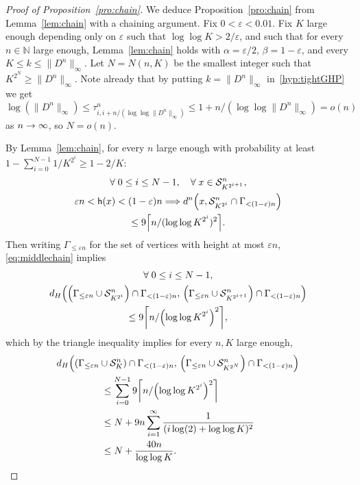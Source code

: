 \documentclass[10pt]{amsart}
\theoremstyle{definition}\newtheorem{defi}[theo]{Definition}\newtheorem{rema}[theo]{Remark}\newtheorem{exam}[theo]{Example}\newtheorem{exem}[theo]{Example}\newtheorem{nota}[theo]{Notation}
\newcommand{\e}{\varepsilon}
\newcommand{\N}{\mathbb{N}}
\newcommand{\1}{\mathbbm{1}}
\newcommand{\trail}{\mathcal{S}}
\newcommand{\h}{\mathsf{h}}
\let\originalleft\left
\let\originalright\right
\renewcommand{\left}{\mathopen{}\mathclose\bgroup\originalleft}
\renewcommand{\right}{\aftergroup\egroup\originalright}
\renewcommand*{\to}{\mathchoice{\longrightarrow}{\rightarrow}{\rightarrow}{\rightarrow}}
\renewcommand*{\implies}{\mathchoice{\Longrightarrow}{\Rightarrow}{\Rightarrow}{\Rightarrow}}
\let\oldforall\forall
\renewcommand*{\forall}{\mathrel{\oldforall}}
\begin{document}
\begin{proof}[Proof of Proposition~\ref{pro:chain}]
We deduce Proposition~\ref{pro:chain} from Lemma~\ref{lem:chain} with a chaining argument. Fix $0<\e<0.01$. Fix $K$ large enough depending only on $\e$ such that $\log \log K>2/\e$, and such that for every $n\in \N$ large enough, Lemma~\ref{lem:chain} holds with $\alpha=\e/2$, $\beta=1-\e$, and every $K\leq k \leq \|D^n\|_\infty$. Let $N=N(n,K)$ be the smallest integer such that $K^{2^N}\geq \|D^n\|_\infty$. { Note already that by putting $k=\|D^n\|_\infty$ in~\ref{hyp:tightGHP} we get
\[
\log(\|D^n\|_\infty) \leq \tau^n_{i,i+n/(\log \log \|D^n\|_\infty)} \leq 1+n/(\log \log\|D^n\|_\infty)=o(n)
\]
as $n \to \infty$, so $N=o(n)$.}

By Lemma~\ref{lem:chain}, for every $n$ large enough with probability at least $1-\sum_{i=0}^{N-1} 1/K^{2^i}\geq 1-2/K$:
\begin{multline}\label{eq:middlechain}
\forall 0\leq i \leq N-1, \quad \forall x\in \trail_{K^{2^{i+1}}}^n,\\
\e n< \h(x)<(1-\e) n \implies d^n\left(x,\trail_{K^{2^i}}^n \cap \Gamma_{<(1-\e) n}\right)\\
\le 9 \left\lceil n/(\log \log K^{2^i})^2 \right\rceil. 
\end{multline}
Then writing $\Gamma_{\leq \e n}$ for the set of vertices with height at most $\e n$, \eqref{eq:middlechain} implies
\begin{multline*}
\forall 0\leq i \leq N-1,\\ d_H\left(\left(\Gamma_{\leq \e n}\cup \trail_{K^{2^i}}^n\right)\cap \Gamma_{<(1-\e) n},\,  \left(\Gamma_{\leq \e n}\cup \trail_{K^{2^{i+1}}}^n\right)\cap \Gamma_{<(1-\e) n} \right)\\
\leq 9 \left\lceil n/\left(\log \log K^{2^i}\right)^2 \right\rceil,
\end{multline*}
which by the triangle inequality implies for every $n,K$ large enough,
\begin{multline*}
d_H \left(\left(\Gamma_{\leq \e n}\cup \trail_K^n\right)\cap \Gamma_{<(1-\e) n}, \, \left(\Gamma_{\leq \e n}\cup \trail_{K^{2^N}}^n\right)\cap \Gamma_{<(1-\e) n} \right)\\
\begin{aligned}
&\leq \sum_{i=0}^{N-1} 9 \left\lceil n/\left(\log \log K^{2^i}\right)^2 \right\rceil \\
&\leq N+9n \sum_{i=1}^\infty \frac{1}{(i\log(2)+\log \log K)^2}\\
&\le N+\frac{40 n}{\log \log K}.
\end{aligned}

\end{multline*}
\end{proof}
\end{document}

